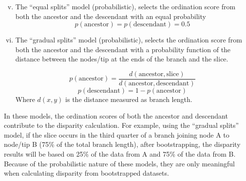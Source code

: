 \documentclass[12pt,a4paper]{article}
\begin{document}
\begin{enumerate}
    \begin{enumerate}[(i)]
    \setcounter{enumii}{4}
      \item The ``equal splits'' model (probabilistic), selects the ordination score from both the ancestor and the descendant with an equal probability
          \begin{equation}
          p(\text{ancestor}) = p(\text{descendant}) = 0.5
          \end{equation}

    \item The ``gradual splits'' model (probabilistic), selects the ordination score from both the ancestor and the descendant with a probability function of the distance between the nodes/tip at the ends of the branch and the slice.

          \begin{equation}
              p(\text{ancestor}) = \frac{d(\text{ancestor},\text{slice})}{d(\text{ancestor},\text{descendant})}
          \end{equation}
          \begin{equation}
              p(\text{descendant}) = 1 - p(\text{ancestor})
          \end{equation}
    \noindent Where $d(x,y)$ is the distance measured as branch length.
    \end{enumerate}

    In these models, the ordination scores of both the ancestor and descendant contribute to the disparity calculation.
    For example, using the ``gradual splits'' model, if the slice occurs in the third quarter of a branch joining node A to node/tip B (75\% of the total branch length), after bootstrapping, the disparity results will be based on 25\% of the data from A and 75\% of the data from B.
    Because of the probabilistic nature of these models, they are only meaningful when calculating disparity from bootstrapped datasets.
\end{enumerate}
\end{document}
